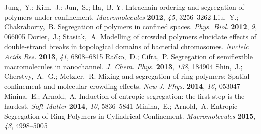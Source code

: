 \documentclass[journal=mamobx,manuscript=article,layout=twocolumn]{achemso}
\begin{document}
\begin{mcitethebibliography}{52}
Jung,~Y.; Kim,~J.; Jun,~S.; Ha,~B.-Y. Intrachain ordering and segregation of
  polymers under confinement. \emph{Macromolecules} \textbf{2012}, \emph{45},
  3256--3262\relax
\mciteBstWouldAddEndPuncttrue
\mciteSetBstMidEndSepPunct{\mcitedefaultmidpunct}
{\mcitedefaultendpunct}{\mcitedefaultseppunct}\relax
\EndOfBibitem
{}
Liu,~Y.; Chakraborty,~B. Segregation of polymers in confined spaces.
  \emph{Phys. Biol.} \textbf{2012}, \emph{9}, 066005\relax
\mciteBstWouldAddEndPuncttrue
\mciteSetBstMidEndSepPunct{\mcitedefaultmidpunct}
{\mcitedefaultendpunct}{\mcitedefaultseppunct}\relax
\EndOfBibitem
{}
Dorier,~J.; Stasiak,~A. Modelling of crowded polymers elucidate effects of
  double-strand breaks in topological domains of bacterial chromosomes.
  \emph{Nucleic Acids Res.} \textbf{2013}, \emph{41}, 6808--6815\relax
\mciteBstWouldAddEndPuncttrue
\mciteSetBstMidEndSepPunct{\mcitedefaultmidpunct}
{\mcitedefaultendpunct}{\mcitedefaultseppunct}\relax
\EndOfBibitem
{}
Ra{\v{c}}ko,~D.; Cifra,~P. Segregation of semiflexible macromolecules in
  nanochannel. \emph{J. Chem. Phys.} \textbf{2013}, \emph{138}, 184904\relax
\mciteBstWouldAddEndPuncttrue
\mciteSetBstMidEndSepPunct{\mcitedefaultmidpunct}
{\mcitedefaultendpunct}{\mcitedefaultseppunct}\relax
\EndOfBibitem
{}
Shin,~J.; Cherstvy,~A.~G.; Metzler,~R. Mixing and segregation of ring polymers:
  Spatial confinement and molecular crowding effects. \emph{New J. Phys.}
  \textbf{2014}, \emph{16}, 053047\relax
\mciteBstWouldAddEndPuncttrue
\mciteSetBstMidEndSepPunct{\mcitedefaultmidpunct}
{\mcitedefaultendpunct}{\mcitedefaultseppunct}\relax
\EndOfBibitem
{}
Minina,~E.; Arnold,~A. Induction of entropic segregation: the first step is the
  hardest. \emph{Soft Matter} \textbf{2014}, \emph{10}, 5836--5841\relax
\mciteBstWouldAddEndPuncttrue
\mciteSetBstMidEndSepPunct{\mcitedefaultmidpunct}
{\mcitedefaultendpunct}{\mcitedefaultseppunct}\relax
\EndOfBibitem
{}
Minina,~E.; Arnold,~A. Entropic Segregation of Ring Polymers in Cylindrical
  Confinement. \emph{Macromolecules} \textbf{2015}, \emph{48}, 4998--5005\relax
\mciteBstWouldAddEndPuncttrue
\mciteSetBstMidEndSepPunct{\mcitedefaultmidpunct}
{\mcitedefaultendpunct}{\mcitedefaultseppunct}\relax

\end{mcitethebibliography}
\end{document}
